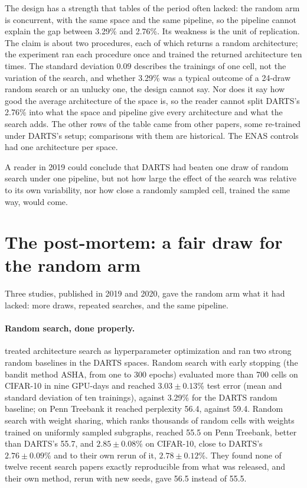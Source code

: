 \begin{refsection}
The design has a strength that tables of the period often lacked: the random arm is concurrent, with the same space and the same pipeline, so the pipeline cannot explain the gap between 3.29\% and 2.76\%. Its weakness is the unit of replication. The claim is about two procedures, each of which returns a random architecture; the experiment ran each procedure once and trained the returned architecture ten times. The standard deviation $0.09$ describes the trainings of one cell, not the variation of the search, and whether 3.29\% was a typical outcome of a 24-draw random search or an unlucky one, the design cannot say. Nor does it say how good the average architecture of the space is, so the reader cannot split DARTS's 2.76\% into what the space and pipeline give every architecture and what the search adds. The other rows of the table came from other papers, some re-trained under DARTS's setup; comparisons with them are historical. The ENAS controls had one architecture per space.

A reader in 2019 could conclude that DARTS had beaten one draw of random search under one pipeline, but not how large the effect of the search was relative to its own variability, nor how close a randomly sampled cell, trained the same way, would come.

\section{The post-mortem: a fair draw for the random arm}\label{sec:controls:postmortem}

Three studies, published in 2019 and 2020, gave the random arm what it had lacked: more draws, repeated searches, and the same pipeline.

\paragraph{Random search, done properly.} \Textcite{LiTalwalkar2019} treated architecture search as hyperparameter optimization and ran two strong random baselines in the DARTS spaces. Random search with early stopping (the bandit method ASHA, from one to 300 epochs) evaluated more than 700 cells on CIFAR-10 in nine GPU-days and reached $3.03\pm0.13$\% test error (mean and standard deviation of ten trainings), against 3.29\% for the DARTS random baseline; on Penn Treebank it reached perplexity 56.4, against 59.4. Random search with weight sharing, which ranks thousands of random cells with weights trained on uniformly sampled subgraphs, reached 55.5 on Penn Treebank, better than DARTS's 55.7, and $2.85\pm0.08$\% on CIFAR-10, close to DARTS's $2.76\pm0.09$\% and to their own rerun of it, $2.78\pm0.12$\%. They found none of twelve recent search papers exactly reproducible from what was released, and their own method, rerun with new seeds, gave 56.5 instead of 55.5.


\end{refsection}

